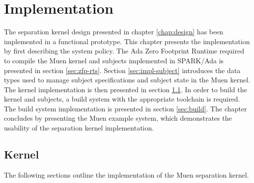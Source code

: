 \chapter{Implementation}\label{chap:impl}
The separation kernel design presented in chapter \ref{chap:design} has been
implemented in a functional prototype. This chapter presents the implementation
by first describing the system policy. The Ada Zero Footprint Runtime required
to compile the Muen kernel and subjects implemented in SPARK/Ada is presented
in section \ref{sec:zfp-rts}. Section \ref{sec:impl-subject} introduces the
data types used to manage subject specifications and subject state in the Muen
kernel. The kernel implementation is then presented in section
\ref{sec:kernel}. In order to build the kernel and subjects, a build system
with the appropriate toolchain is required. The build system implementation is
presented in section \ref{sec:build}. The chapter concludes by presenting the
Muen example system, which demonstrates the usability of the separation kernel
implementation.





\section{Kernel}\label{sec:kernel}
The following sections outline the implementation of the Muen separation
kernel.












